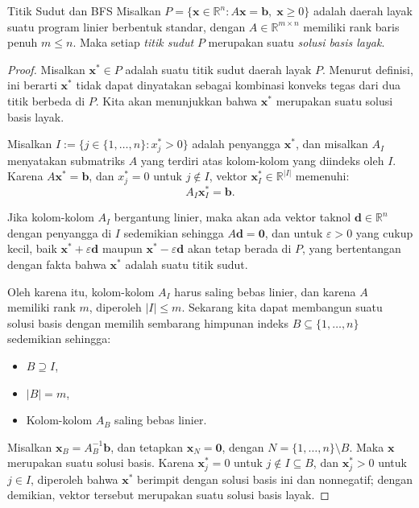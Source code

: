 \begin{proposition}{Titik Sudut dan BFS}
Misalkan \( P = \{ \mathbf{x} \in \mathbb{R}^n : A\mathbf{x} = \mathbf{b},\; \mathbf{x} \geq 0 \} \) adalah daerah layak suatu program linier berbentuk standar, dengan \( A \in \mathbb{R}^{m \times n} \) memiliki rank baris penuh \( m \leq n \). Maka setiap \emph{titik sudut} \( P \) merupakan suatu \emph{solusi basis layak}.
\end{proposition}

\begin{proof}
Misalkan \( \mathbf{x}^* \in P \) adalah suatu titik sudut daerah layak \( P \). Menurut definisi, ini berarti \( \mathbf{x}^* \) tidak dapat dinyatakan sebagai kombinasi konveks tegas dari dua titik berbeda di \( P \). Kita akan menunjukkan bahwa \( \mathbf{x}^* \) merupakan suatu solusi basis layak.

Misalkan \( I := \{ j \in \{1, \dots, n\} : x^*_j > 0 \} \) adalah penyangga \( \mathbf{x}^* \), dan misalkan \( A_I \) menyatakan submatriks \( A \) yang terdiri atas kolom-kolom yang diindeks oleh \( I \). Karena \( A\mathbf{x}^* = \mathbf{b} \), dan \( x^*_j = 0 \) untuk \( j \notin I \), vektor \( \mathbf{x}^*_I \in \mathbb{R}^{|I|} \) memenuhi:
\[
A_I \mathbf{x}^*_I = \mathbf{b}.
\]

Jika kolom-kolom \( A_I \) bergantung linier, maka akan ada vektor taknol \( \mathbf{d} \in \mathbb{R}^n \) dengan penyangga di \( I \) sedemikian sehingga \( A\mathbf{d} = \mathbf{0} \), dan untuk \( \varepsilon > 0 \) yang cukup kecil, baik \( \mathbf{x}^* + \varepsilon \mathbf{d} \) maupun \( \mathbf{x}^* - \varepsilon \mathbf{d} \) akan tetap berada di \( P \), yang bertentangan dengan fakta bahwa \( \mathbf{x}^* \) adalah suatu titik sudut.

Oleh karena itu, kolom-kolom \( A_I \) harus saling bebas linier, dan karena \( A \) memiliki rank \( m \), diperoleh \( |I| \leq m \). Sekarang kita dapat membangun suatu solusi basis dengan memilih sembarang himpunan indeks \( B \subseteq \{1, \dots, n\} \) sedemikian sehingga:
\begin{itemize}
    \item \( B \supseteq I \),
    \item \( |B| = m \),
    \item Kolom-kolom \( A_B \) saling bebas linier.
\end{itemize}

Misalkan \( \mathbf{x}_B = A_B^{-1} \mathbf{b} \), dan tetapkan \( \mathbf{x}_N = \mathbf{0} \), dengan \( N = \{1, \dots, n\} \setminus B \). Maka \( \mathbf{x} \) merupakan suatu solusi basis. Karena \( \mathbf{x}^*_j = 0 \) untuk \( j \notin I \subseteq B \), dan \( \mathbf{x}^*_j > 0 \) untuk \( j \in I \), diperoleh bahwa \( \mathbf{x}^* \) berimpit dengan solusi basis ini dan nonnegatif; dengan demikian, vektor tersebut merupakan suatu solusi basis layak.
\end{proof}

